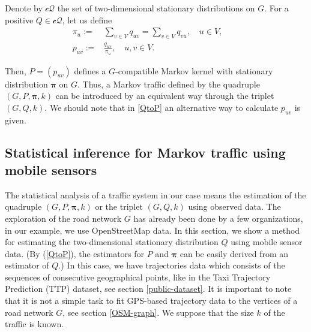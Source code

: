 \documentclass[b5paper,12pt]{report}
\theoremstyle{definition}
\newcommand{\bpi}{\boldsymbol{\pi}}
\begin{document}
Denote by $\mathcal{cQ}$ the set of two-dimensional stationary distributions on $G$. For a positive $Q\in\mathcal{cQ}$, let us define
\begin{equation}\label{QtoP}
\begin{aligned}
        \pi_u := &\sum_{v\in V} q_{uv} = \sum_{v\in V} q_{vu}, \quad u\in V, \qquad
        \\ p_{uv} := &\frac{q_{uv}}{\pi_u} ,\quad u,v\in V.
\end{aligned}
\end{equation} 

Then, $P=(p_{uv})$ defines a $G$-compatible Markov kernel with stationary distribution $\bpi$ on $G$. Thus, a Markov traffic defined by the quadruple $(G,P,\bpi,k)$ can be introduced by an equivalent way through the triplet $(G,Q,k)$. We should note that in \ref{QtoP} an alternative way to calculate $p_{uv}$ is given.

\subsection{Statistical inference for Markov traffic using mobile sensors}
\label{inference}

The statistical analysis of a traffic system in our case means the estimation of the quadruple $(G,P,\bpi,k)$ or the triplet $(G,Q,k)$ using observed data. The exploration of the road network $G$ has already been done by a few organizations, in our example, we use OpenStreetMap data. In this section, we show a method for estimating the two-dimensional stationary distribution $Q$ using mobile sensor data. (By (\ref{QtoP}), the estimators for $P$ and $\bpi$ can be easily derived from an estimator of $Q$.) In this case, we have trajectories data which consists of the sequences of consecutive geographical points, like in the Taxi Trajectory Prediction (TTP) dataset, see section \ref{public-dataset}. It is important to note that it is not a simple task to fit GPS-based trajectory data to the vertices of a road network $G$, see section \ref{OSM-graph}. We suppose that the size $k$ of the traffic is known.
\end{document}
